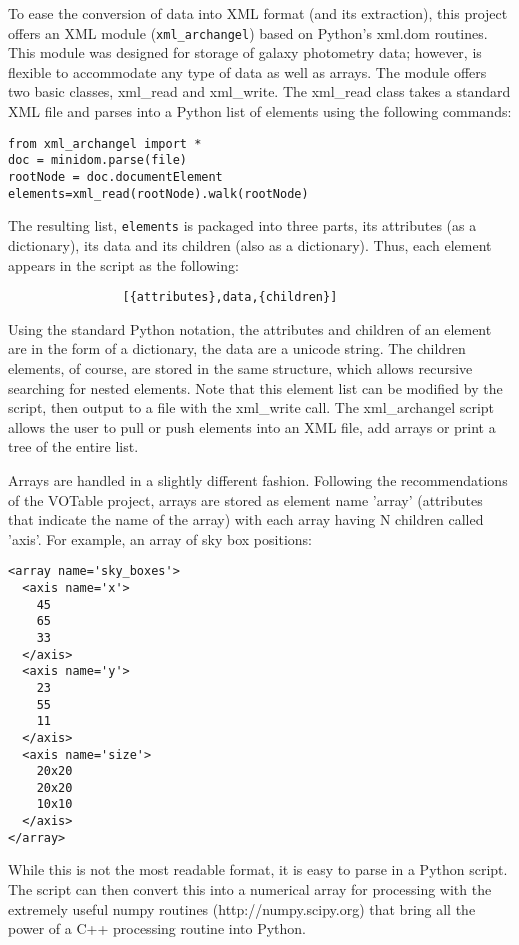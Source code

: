 \documentclass[11pt,preprint,graphicx]{aastex}
\begin{document}
\noindent To ease the conversion of data into XML format (and its
extraction), this project offers an XML module ({\tt xml\_archangel}) based
on Python's xml.dom routines.  This module was designed for storage of
galaxy photometry data; however, is flexible to accommodate any type of
data as well as arrays.  The module offers two basic classes, xml\_read and
xml\_write.  The xml\_read class takes a standard XML file and parses into
a Python list of elements using the following commands:

\begin{verbatim}
from xml_archangel import *
doc = minidom.parse(file)
rootNode = doc.documentElement
elements=xml_read(rootNode).walk(rootNode)
\end{verbatim}

\noindent The resulting list, {\tt elements} is packaged into three parts, its
attributes (as a dictionary), its data and its children (also as a
dictionary).  Thus, each element appears in the script as the following:

\begin{verbatim}
                [{attributes},data,{children}]
\end{verbatim}

\noindent Using the standard Python notation, the attributes and children of
an element are in the form of a dictionary, the data are a unicode string.
The children elements, of course, are stored in the same structure, which
allows recursive searching for nested elements.  Note that this element
list can be modified by the script, then output to a file with the
xml\_write call.  The xml\_archangel script allows the user to pull or push
elements into an XML file, add arrays or print a tree of the entire
list.

\noindent Arrays are handled in a slightly different fashion.  Following
the recommendations of the VOTable project, arrays are stored as element
name 'array' (attributes that indicate the name of the array) with each
array having N children called 'axis'.  For example, an array of sky box
positions:

\begin{verbatim}
<array name='sky_boxes'>
  <axis name='x'>
    45
    65
    33
  </axis>
  <axis name='y'>
    23
    55
    11
  </axis>
  <axis name='size'>
    20x20
    20x20
    10x10
  </axis>
</array>
\end{verbatim}

\noindent While this is not the most readable format, it is easy to parse
in a Python script.  The script can then convert this into a numerical
array for processing with the extremely useful numpy routines
(http://numpy.scipy.org) that bring all the power of a C++ processing
routine into Python.
\end{document}
